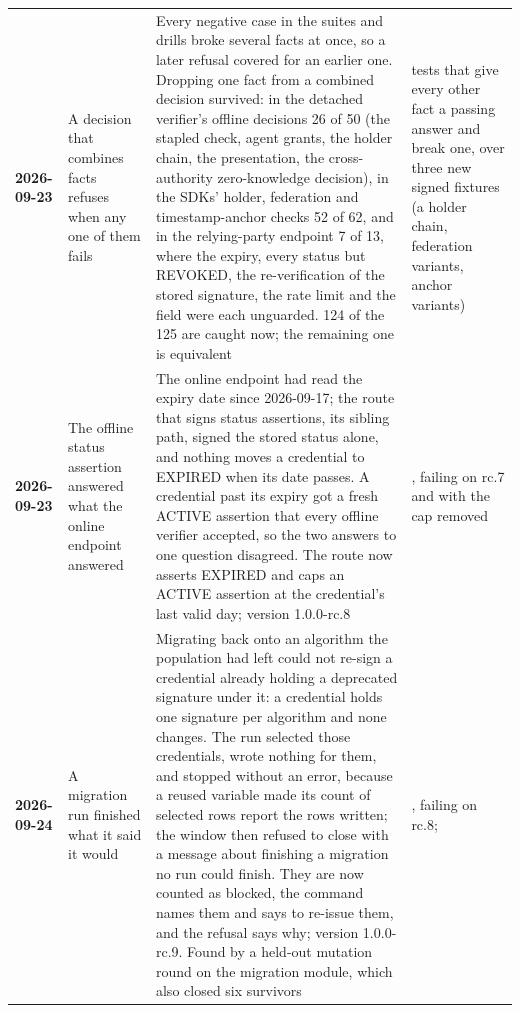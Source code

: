 {\begin{xltabular}{\textwidth}{>{\bfseries\hspace{0pt}}p{0.62in} >{\RaggedRight\arraybackslash\hspace{0pt}}X >{\RaggedRight\arraybackslash\hspace{0pt}}X >{\RaggedRight\arraybackslash\hspace{0pt}}p{1.6in}}
2026-09-23 & A decision that combines facts refuses when any one of them fails & Every negative case in the suites and drills broke several facts at once, so a later refusal covered for an earlier one. Dropping one fact from a combined decision survived: in the detached verifier's offline decisions 26 of 50 (the stapled check, agent grants, the holder chain, the presentation, the cross-authority zero-knowledge decision), in the SDKs' holder, federation and timestamp-anchor checks 52 of 62, and in the relying-party endpoint 7 of 13, where the expiry, every status but REVOKED, the re-verification of the stored signature, the rate limit and the  field were each unguarded. 124 of the 125 are caught now; the remaining one is equivalent & tests that give every other fact a passing answer and break one, over three new signed fixtures (a holder chain, federation variants, anchor variants) \\
2026-09-23 & The offline status assertion answered what the online endpoint answered & The online endpoint had read the expiry date since 2026-09-17; the route that signs status assertions, its sibling path, signed the stored status alone, and nothing moves a credential to EXPIRED when its date passes. A credential past its expiry got a fresh ACTIVE assertion that every offline verifier accepted, so the two answers to one question disagreed. The route now asserts EXPIRED and caps an ACTIVE assertion at the credential's last valid day; version 1.0.0-rc.8 & , failing on rc.7 and with the cap removed \\
2026-09-24 & A migration run finished what it said it would & Migrating back onto an algorithm the population had left could not re-sign a credential already holding a deprecated signature under it: a credential holds one signature per algorithm and none changes. The run selected those credentials, wrote nothing for them, and stopped without an error, because a reused variable made its count of selected rows report the rows written; the window then refused to close with a message about finishing a migration no run could finish. They are now counted as blocked, the command names them and says to re-issue them, and the refusal says why; version 1.0.0-rc.9. Found by a held-out mutation round on the migration module, which also closed six survivors & , failing on rc.8;  \\

\end{xltabular}}
